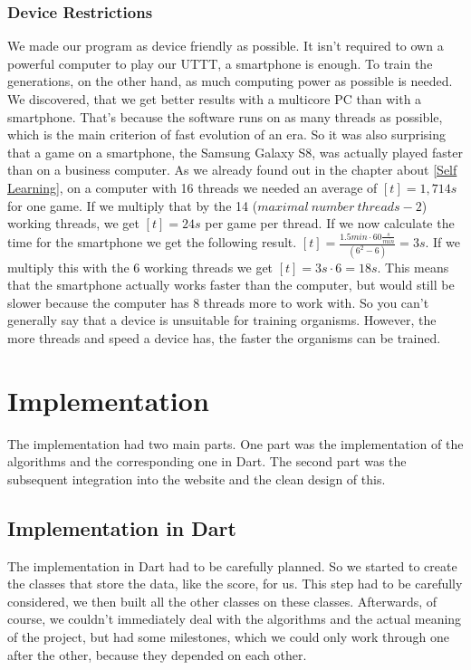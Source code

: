 
\subsubsection{Device Restrictions}
We made our program as device friendly as possible. It isn't required to own a powerful computer to play our \ac{UTTT}, a smartphone is enough. To train the generations, on the other hand, as much computing power as possible is needed. We discovered, that we get better results with a multicore PC than with a smartphone. That's because the software runs on as many threads as possible, which is the main criterion of fast evolution of an era. So it was also surprising that a game on a smartphone, the Samsung Galaxy S8, was actually played faster than on a business computer. 
As we already found out in the chapter about \autoref{Self Learning}, on a computer with 16 threads we needed an average of $[t] = 1,714s$ for one game. If we multiply that by the 14 ($maximal\ number\ threads - 2$) working threads, we get $[t] = 24 s$ per game per thread.
If we now calculate the time for the smartphone we get the following result. $ [t] = \frac{1.5min \cdot 60\frac{s}{min}}{(6^2 - 6)} = 3s$. If we multiply this with the 6 working threads we get $[t] = 3s \cdot 6 = 18s$. This means that the smartphone actually works faster than the computer, but would still be slower because the computer has 8 threads more to work with. So you can't generally say that a device is unsuitable for training organisms. However, the more threads and speed a device has, the faster the organisms can be trained.




\section{Implementation}
The implementation had two main parts. One part was the implementation of the algorithms and the corresponding one in Dart. The second part was the subsequent integration into the website and the clean design of this.

\subsection{Implementation in Dart}
The implementation in Dart had to be carefully planned. So we started to create the classes that store the data, like the score, for us. This step had to be carefully considered, we then built all the other classes on these classes. Afterwards, of course, we couldn't immediately deal with the algorithms and the actual meaning of the project, but had some milestones, which we could only work through one after the other, because they depended on each other.

